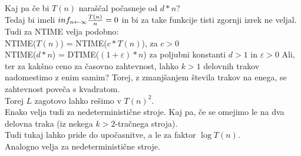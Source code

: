 \documentclass[10pt,a4paper,oneside]{book}
\begin{document}
{{}
Kaj pa če bi $T(n)$ naraščal počasneje od $d*n$?\\
Tedaj bi imeli $inf_{n\leftarrow\infty} {T(n) \over n} = 0$ %
 in bi za take funkcije tisti zgornji izrek ne veljal.%
\br
Tudi za NTIME velja podobno:\\
	NTIME($T(n)$) = NTIME($c*T(n)$), za $c>0$\\%
	NTIME($d*n$) = DTIME($(1+\varepsilon)*n$) za poljubni konstanti $d>1$ in $\varepsilon>0$
Ali, ter za kakšno ceno za časovno zahtevnost, lahko $k>1$ delovnih trakov nadomestimo z enim samim?
Torej, z zmanjšanjem števila trakov na enega, se zahtevnost poveča s kvadratom.\\
Torej $L$ zagotovo lahko rešimo v $T(n)^2$.\\
Enako velja tudi za nedeterministične stroje.
\br
Kaj pa, če se omejimo le na dva delovna traka (iz nekega $k>2$-tračnega stroja).\\
Tudi tukaj lahko pride do upočasnitve, a le za faktor $\log T(n)$.\\
Analogno velja za nedeterministične stroje.}
\end{document}
